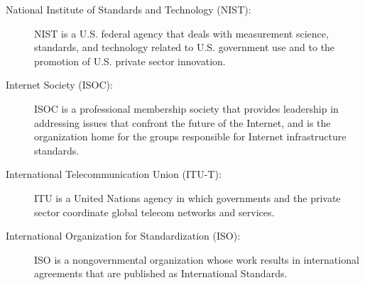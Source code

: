 \documentclass{article}
\begin{document}
                        \begin{description}
                            \item[National Institute of Standards and Technology (NIST):] NIST is a U.S. federal agency that deals with measurement science, standards, and technology related to U.S. government use and to the promotion of U.S. private sector innovation.
                            
                            \item[Internet Society (ISOC):] ISOC is a professional membership society that provides leadership in addressing issues that confront the future of the Internet, and is the organization home for the groups responsible for Internet infrastructure standards.
                            
                            \item[International Telecommunication Union (ITU-T):] ITU is a United Nations agency in which governments and the private sector coordinate global telecom networks and services.
                            
                            \item[International Organization for Standardization (ISO):] ISO is a nongovernmental organization whose work results in international agreements that are published as International Standards.
                        \end{description}
\end{document}
